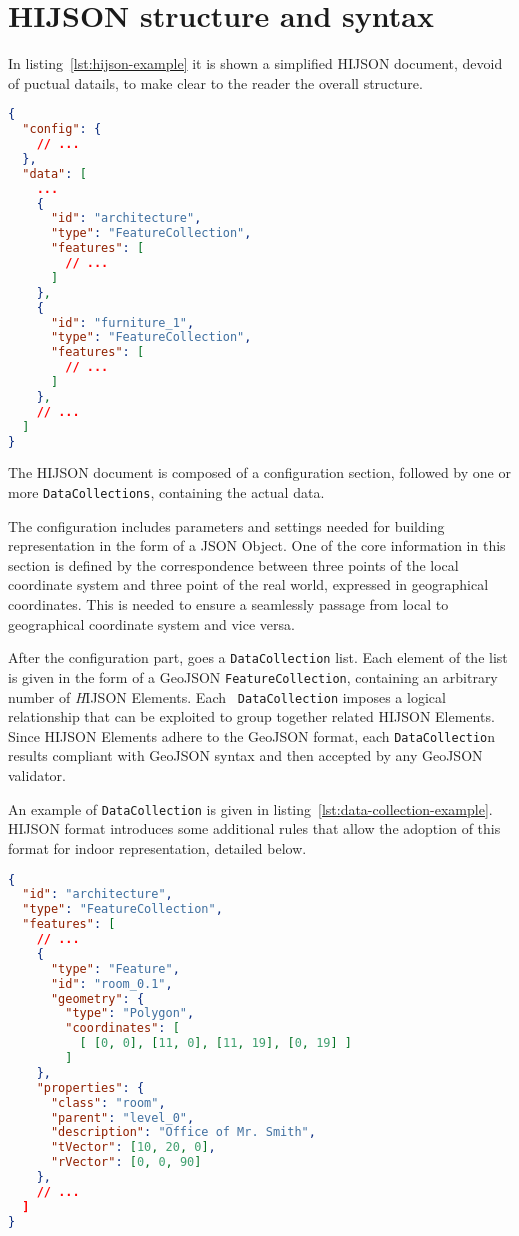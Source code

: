 
\section{HIJSON structure and syntax}\label{hijson-syntax}

In listing~\ref{lst:hijson-example} it is shown a simplified HIJSON document, devoid of puctual datails, to make clear to the reader the overall structure.

\begin{lstlisting}[language=json, label={lst:hijson-example}, captionpos=b, caption=Example of HIJSON document.]
{
  "config": {
    // ...
  },
  "data": [
    ...
    {
      "id": "architecture",
      "type": "FeatureCollection",
      "features": [
        // ...
      ] 
    },
    {
      "id": "furniture_1",
      "type": "FeatureCollection",
      "features": [
        // ...
      ] 
    },
    // ...
  ]
}
\end{lstlisting}


The HIJSON document is composed of a configuration section, followed by one or more {\tt DataCollections}, containing the actual data.

The configuration includes parameters and settings needed for building representation in the form of a JSON Object. One of the core information in this section is defined by the correspondence between three points of the local coordinate system and three point of the real world, expressed in geographical coordinates. This is needed to ensure a seamlessly passage from local to geographical coordinate system and vice versa.

After the configuration part, goes a {\tt DataCollection} list. Each element
of the list is given in the form of a GeoJSON {\tt FeatureCollection},
containing an arbitrary  number of {\emph HIJSON Elements}. Each {\tt
DataCollection} imposes a logical relationship that can be exploited to group
together related HIJSON Elements. Since  HIJSON Elements adhere to the GeoJSON
format, each {\tt DataCollectio}n results compliant with GeoJSON syntax and
then accepted by any GeoJSON validator.

An example of {\tt DataCollection} is given in listing~\ref{lst:data-collection-example}. HIJSON format introduces some additional rules that allow the adoption of this format for indoor representation, detailed below.

\begin{lstlisting}[language=json, label={lst:data-collection-example}, captionpos=b,  caption=Example of {\tt DataCollection}.]
{
  "id": "architecture",
  "type": "FeatureCollection",
  "features": [
    // ...
    {
      "type": "Feature",
      "id": "room_0.1",
      "geometry": {
        "type": "Polygon",
        "coordinates": [ 
          [ [0, 0], [11, 0], [11, 19], [0, 19] ]
        ]
    },
    "properties": {
      "class": "room",
      "parent": "level_0",
      "description": "Office of Mr. Smith",
      "tVector": [10, 20, 0],
      "rVector": [0, 0, 90]
    },
    // ...
  ]
}
\end{lstlisting}


